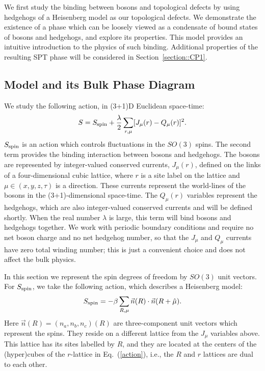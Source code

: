 \documentclass[prb,twocolumn]{revtex4-1}
\begin{document}
We first study the binding between bosons and topological defects by using hedgehogs of a Heisenberg model as our topological defects. We demonstrate the existence of a phase which can be loosely viewed as a condensate of bound states of bosons and hedgehogs, and explore its properties. This model provides an intuitive introduction to the physics of such binding. Additional properties of the resulting SPT phase will be considered in Section~\ref{section::CP1}.

\subsection{Model and its Bulk Phase Diagram}
\label{subsec::bulkheis}
We study the following action, in (3+1)D Euclidean space-time:
\begin{equation}
S=S_{\rm spin}+\frac{\lambda}{2}\sum_{r,\mu} [ J_\mu(r)- Q_\mu(r)]^2.
\label{action}
\end{equation}
$S_{\rm spin}$ is an action which controls fluctuations in the $SO(3)$ spins. The second term provides the binding interaction between bosons and hedgehogs. The bosons are represented by integer-valued conserved currents, $J_\mu(r)$, defined on the links of a four-dimensional cubic lattice, where $r$ is a site label on the lattice and $\mu\in (x,y,z,\tau)$ is a direction. These currents represent the world-lines of the bosons in the (3+1)-dimensional space-time. The $Q_\mu(r)$ variables represent the hedgehogs, which are also integer-valued conserved currents and will be defined shortly.  When the real number $\lambda$ is large, this term will bind bosons and hedgehogs together. We work with periodic boundary conditions and require no net boson charge and no net hedgehog number, so that the $J_\mu$ and $Q_\mu$ currents have zero total winding number; this is just a convenient choice and does not affect the bulk physics.

In this section we represent the spin degrees of freedom by $SO(3)$ unit vectors. For $S_{\rm spin}$, we take the following action, which describes a Heisenberg model:
\begin{equation}
S_{\rm spin}=-\beta\sum_{R,\mu} \vec{n}(R)\cdot \vec{n}(R+\hat{\mu}).
\label{SHeis}
\end{equation}
Here $\vec{n}(R)=(n_a,n_b,n_c)(R)$ are three-component unit vectors which represent the spins. They reside on a different lattice from the $J_\mu$ variables above. This lattice has its sites labelled by $R$, and they are located at the centers of the (hyper)cubes of the $r$-lattice in Eq.~(\ref{action}), i.e., the $R$ and $r$ lattices are dual to each other.  
\end{document}
